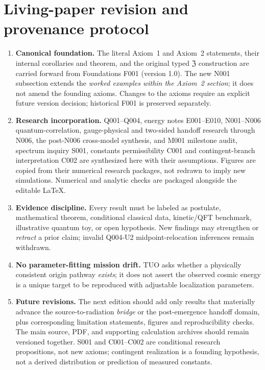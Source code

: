 \documentclass[11pt,a4paper]{article}
\theoremstyle{tmon}
\theoremstyle{definition}
\begin{document}
\section{Living-paper revision and provenance protocol}\label{sec:revisions}
\begin{enumerate}
\item \textbf{Canonical foundation.} The literal Axiom~1 and Axiom~2 statements, their internal corollaries and theorem, and the original typed $\mathfrak Z$ construction are carried forward from Foundations F001 (version 1.0). The new N001 subsection extends the \emph{worked examples within the Axiom~2 section}; it does not amend the founding axioms. Changes to the axioms require an explicit future version decision; historical F001 is preserved separately.
\item \textbf{Research incorporation.} Q001--Q004, energy notes E001--E010, N001--N006 quantum-correlation, gauge-physical and two-sided handoff research through N006, the post-N006 cross-model synthesis, and M001 milestone audit, spectrum inquiry S001, constants permissibility C001 and contingent-branch interpretation C002 are synthesized here with their assumptions. Figures are copied from their numerical research packages, not redrawn to imply new simulations. Numerical and analytic checks are packaged alongside the editable LaTeX.
\item \textbf{Evidence discipline.} Every result must be labeled as postulate, mathematical theorem, conditional classical data, kinetic/QFT benchmark, illustrative quantum toy, or open hypothesis. New findings may strengthen or \emph{retract} a prior claim; invalid Q004-U2 midpoint-relocation inferences remain withdrawn.
\item \textbf{No parameter-fitting mission drift.} TUO asks whether a physically consistent origin pathway \emph{exists}; it does not assert the observed cosmic energy is a unique target to be reproduced with adjustable localization parameters.
\item \textbf{Future revisions.} The next edition should add only results that materially advance the source-to-radiation \emph{bridge} or the post-emergence handoff domain, plus corresponding limitation statements, figures and reproducibility checks. The main source, PDF, and supporting calculation archives should remain versioned together. S001 and C001--C002 are conditional research propositions, not new axioms; contingent realization is a founding hypothesis, not a derived distribution or prediction of measured constants.
\end{enumerate}
\end{document}
